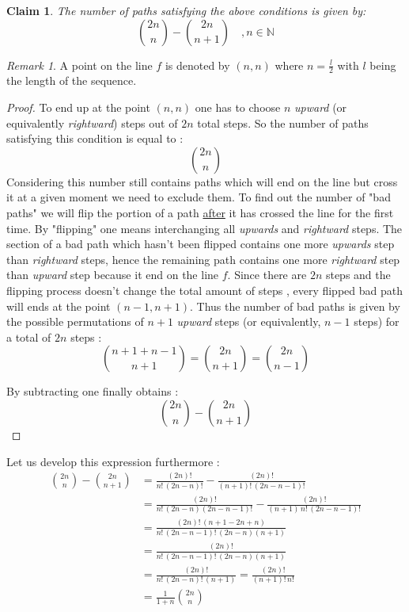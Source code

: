 \documentclass[a4paper,13pt,oneside]{article}
\newtheorem*{claim}{Claim}
\theoremstyle{remark}
\newtheorem*{remark}{Remark}
\begin{document}
\begin{claim} \label{claim}
The number of paths satisfying the above conditions is given by:
\[
\boxed{\binom{2n}{n} - \binom{2n}{n+1}  \quad ,n\in \mathbb{N}}
\]	
\end{claim}
\bigskip
\begin{remark}
A point on the line $f$ is denoted by $(n,n)$ where $n =\frac{l}{2}$ with $l$ being the length of the sequence.
\end{remark}
\bigskip
\begin{proof}
To end up at the point $(n,n)$ one has to choose $n$ \textit{upward} (or equivalently \textit{rightward}) steps out of $2n$ total steps. So the number of paths satisfying this condition is equal to : 
\[\binom{2n}{n}\] 
Considering this number still contains paths which will end on the line but cross it at a given moment we need to exclude them.
To find out the number of "bad paths" we will flip the portion of a path \underline{after}  it has crossed the line for the first time. By "flipping" one means interchanging all  \textit{upwards} and \textit{rightward} steps.
The section of a bad path which hasn't been flipped contains one more \textit{upwards} step than \textit{rightward} steps, hence the remaining path contains one more \textit{rightward} step than \textit{upward} step because it end on the line $f$. Since there are $2n$ steps and the flipping process doesn't change the total amount of steps , every flipped bad path will ends at the point $(n-1,n+1)$.
Thus the number of bad paths is given by the possible permutations of $n+1$ \textit{upward} steps (or equivalently, $n-1$  steps)  for a total of $2n$ steps : 
\[
\binom{n+1+n-1}{n+1} =\binom{2n}{n+1}= \binom{2n}{n-1}
\]

By subtracting  one finally obtains :
\[
\binom{2n}{n} - \binom{2n}{n+1}
\]


\end{proof}
\bigskip

Let us develop this expression furthermore :
\begin{align*}
\binom{2n}{n} - \binom{2n}{n+1} &= \frac{(2n)!}{n! \, (2n-n)!} - \frac{(2n)!}{(n+1)! \, (2n-n-1)!}\\
&= \frac{(2n)!}{n! \, (2n-n)(2n-n-1)!} - \frac{(2n)!}{(n+1)\,n! \, (2n-n-1)!}\\
&= \frac{(2n)! \, (n+1-2n+n)}{n!\,(2n-n-1)!\,(2n-n)(n+1)}\\
&=\frac{(2n)!}{n!\,(2n-n-1)!\,(2n-n)(n+1)}\\
&= \frac{(2n)!}{n!\,(2n-n)!\,(n+1)} = \frac{(2n)!}{(n+1)! \,n!}\\
&= \frac{1}{1+n} \binom{2n}{n}
\end{align*}
\end{document}
